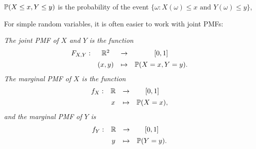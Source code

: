 \begin{remark}%
$\mathbb{P}(X\leq x, Y\leq y)$ is the probability of the event $\{\omega: X(\omega)\leq x \text{ and } Y(\omega)\leq y\}$,
\end{remark}

For simple random variables, it is often easier to work with joint PMFs:
\begin{definition}
\ben
\it The \emph{joint PMF} of $X$ and $Y$ is the function
\[
\begin{array}{cccc}
F_{X,Y}:	& \mathbb{R}^2	& \to		& [0,1] \\[1ex]
			& (x,y) & \mapsto	& \mathbb{P}(X=x, Y=y).
\end{array}
\]
\it The \emph{marginal PMF} of $X$ is the function
\[
\begin{array}{cccc}
f_X:	& \mathbb{R} 	& \to		& [0,1] \\[1ex]
		& x				& \mapsto	& \mathbb{P}(X=x),
\end{array}
\]
and the marginal PMF of $Y$ is
\[
\begin{array}{cccc}
f_Y:	& \mathbb{R}	& \to		& [0,1] \\[1ex]
		& y				& \mapsto	& \mathbb{P}(Y=y).
\end{array}
\]
\een
\end{definition}

